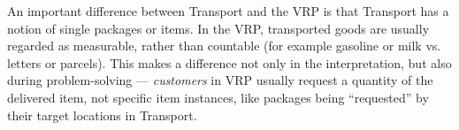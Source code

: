 
An important difference between Transport and the VRP is that Transport has a notion of single packages or items. In the VRP, transported goods are usually regarded as measurable, rather than countable (for example gasoline or milk vs. letters or parcels). This makes a difference not only in the
interpretation, but also during problem-solving --- \textit{customers} in VRP usually request
a quantity of the delivered item, not specific item instances, like packages being ``requested''
by their target locations in Transport.
